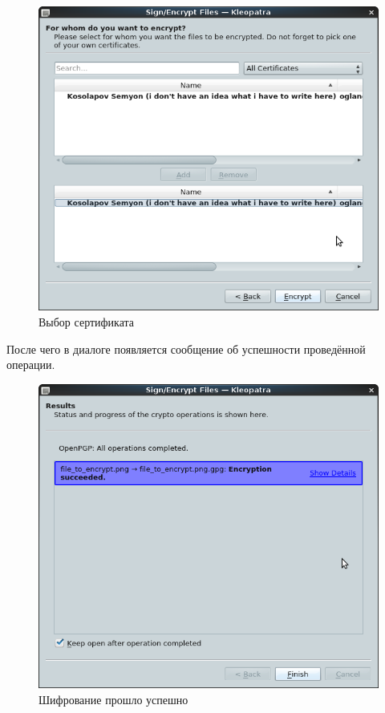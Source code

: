 \documentclass[a4paper]{article}
\begin{document}
\begin{figure}[H]
	\begin{center}
		\includegraphics[scale=0.5]{pics/Screenshot at 2016-04-18 00:56:58.png}
		\caption{Выбор сертификата} 
		\label{pic:pic_name} %
	\end{center}
\end{figure}

После чего в диалоге появляется сообщение об успешности проведённой операции.

\begin{figure}[H]
	\begin{center}
		\includegraphics[scale=0.5]{pics/Screenshot at 2016-04-18 00:57:07.png}
		\caption{Шифрование прошло успешно} 
		\label{pic:pic_name} %
	\end{center}
\end{figure}
\end{document}
